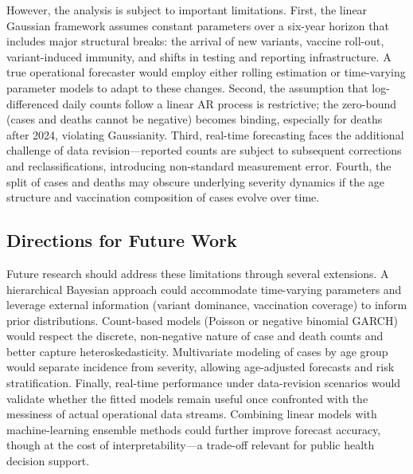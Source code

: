 ﻿\documentclass[12pt,a4paper]{article}
\begin{document}
However, the analysis is subject to important limitations. First, the linear Gaussian framework assumes constant parameters over a six-year horizon that includes major structural breaks: the arrival of new variants, vaccine roll-out, variant-induced immunity, and shifts in testing and reporting infrastructure. A true operational forecaster would employ either rolling estimation or time-varying parameter models to adapt to these changes. Second, the assumption that log-differenced daily counts follow a linear AR process is restrictive; the zero-bound (cases and deaths cannot be negative) becomes binding, especially for deaths after 2024, violating Gaussianity. Third, real-time forecasting faces the additional challenge of data revision---reported counts are subject to subsequent corrections and reclassifications, introducing non-standard measurement error. Fourth, the split of cases and deaths may obscure underlying severity dynamics if the age structure and vaccination composition of cases evolve over time.

\subsection*{Directions for Future Work}

Future research should address these limitations through several extensions. A hierarchical Bayesian approach could accommodate time-varying parameters and leverage external information (variant dominance, vaccination coverage) to inform prior distributions. Count-based models (Poisson or negative binomial GARCH) would respect the discrete, non-negative nature of case and death counts and better capture heteroskedasticity. Multivariate modeling of cases by age group would separate incidence from severity, allowing age-adjusted forecasts and risk stratification. Finally, real-time performance under data-revision scenarios would validate whether the fitted models remain useful once confronted with the messiness of actual operational data streams. Combining linear models with machine-learning ensemble methods could further improve forecast accuracy, though at the cost of interpretability---a trade-off relevant for public health decision support.

\appendix


\end{document}
